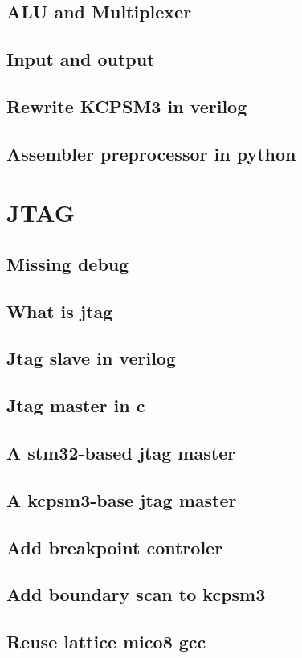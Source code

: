 \documentclass[a4paper]{book}
\begin{document}
\begin{CJK*}{UTF8}{song}
\chapter{ALU and Multiplexer}
\chapter{Input and output}
\chapter{Rewrite KCPSM3 in verilog}
\chapter{Assembler preprocessor in python}

\part{JTAG}
\chapter{Missing debug}
\chapter{What is jtag}
\chapter{Jtag slave in verilog}
\chapter{Jtag master in c}
\chapter{A stm32-based jtag master}
\chapter{A kcpsm3-base jtag master}
\chapter{Add breakpoint controler}
\chapter{Add boundary scan to kcpsm3}
\chapter{Reuse lattice mico8 gcc}


\end{CJK*}
\end{document}
